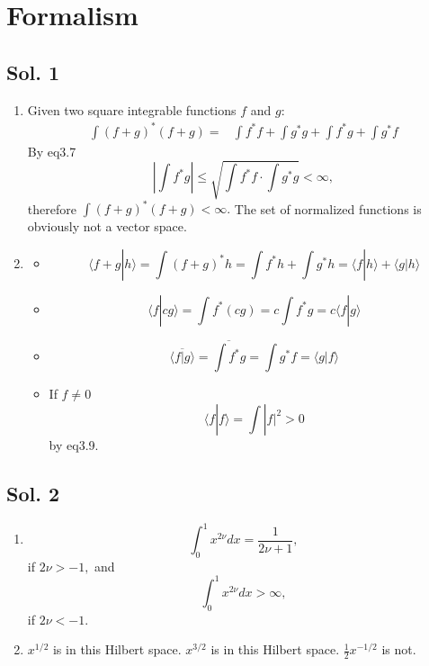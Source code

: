 \section{Formalism}
\subsection*{Sol. 1}
\begin{enumerate}
    \item Given two square integrable functions $f$ and $g:$
    \begin{align*}
        \int (f+g)^*(f+g)=&
        \int f^*f + \int g^*g 
        +\int f^*g + \int g^*f
    \end{align*}
    By eq3.7
    $$
    \left|\int f^*g\right|
    \leq \sqrt{\int f^*f\cdot \int g^*g} < \infty,
    $$
    therefore $ \int (f+g)^*(f+g)<\infty.$
    The set of normalized functions is obviously not a vector space.
    \item 
    \begin{itemize}
        \item 
        $$
        \langle
        f+g|h
        \rangle
        =
        \int(f+g)^*h
        =\int f^*h + \int g^*h
        =\langle
        f|h
        \rangle
        +\langle
        g|h
        \rangle
        $$
        \item 
        $$
        \langle f|cg\rangle
        =
        \int f^*(cg)
        =
        c\int f^*g
        =c\langle f|g\rangle
        $$
        \item 
        $$
        \overline{
        \langle f|g\rangle
        }
        =
        \overline{\int f^*g}
        =
        \int g^*f
        =\langle g|f\rangle
        $$
        \item 
        If $f\neq 0$
        $$
        \langle f|f\rangle
        =\int |f|^2 >0
        $$ by eq3.9.
    \end{itemize}
\end{enumerate}
\subsection*{Sol. 2}
\begin{enumerate}
    \item 
    $$
    \int_0^1 x^{2\nu}dx = \frac{1}{2\nu+1},
    $$
    if $2\nu>-1,$  and 
    $$
    \int_0^1 x^{2\nu}dx > \infty,
    $$
    if $2\nu<-1.$
    \item $x^{1/2}$ is in this Hilbert space. $x^{3/2}$ is in this Hilbert space. $\frac{1}{2}x^{-1/2}$ is not.

\end{enumerate}

